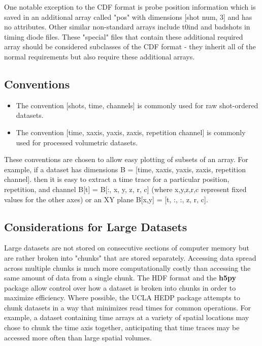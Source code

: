 \documentclass[12pt]{article}
\newcommand{\loc}[1]{
{\bf \fontfamily{pcr}\selectfont #1}
}
\newcommand{\todo}[1]{ \begin{tcolorbox} \centering  #1 \end{tcolorbox}}
\begin{document}
\todo{
One notable exception to the CDF format is probe position information which is saved in an additional array called "pos" with dimensions [shot num, 3] and has no attributes. Other similar non-standard arrays include t0ind and badshots in timing diode files. These "special" files that contain these additional required array should be considered subclasses of the CDF format - they inherit all of the normal requirements but also require these additional arrays.
}

\subsection{Conventions}
\begin{itemize}
\item The convention [shots, time, channels] is commonly used for raw shot-ordered datasets.
\item The convention [time, xaxis, yaxis, zaxis, repetition channel] is commonly used for processed volumetric datasets. 
\end{itemize}

These conventions are chosen to allow easy plotting of subsets of an array. For example, if a dataset has dimensions B = [time, xaxis, yaxis, zaxis, repetition channel]. then it is easy to extract a time trace for a particular position, repetition, and channel B[t] = B[:, x, y, z, r, c] (where x,y,z,r,c represent fixed values for the other axes) or an XY plane B[x,y] = [t, :, :, z, r, c]. 

\subsection{Considerations for Large Datasets}

Large datasets are not stored on consecutive sections of computer memory but are rather broken into "chunks" that are stored separately. Accessing data spread across multiple chunks is much more computationally costly than accessing the same amount of data from a single chunk. The HDF format and the \loc{h5py} package allow control over how a dataset is broken into chunks in order to maximize efficiency. Where possible, the UCLA HEDP package attempts to chunk datasets in a way that minimizes read times for common operations. For example, a dataset containing time arrays at a variety of spatial locations may chose to chunk the time axis together, anticipating that time traces may be accessed more often than large spatial volumes.
\end{document}
